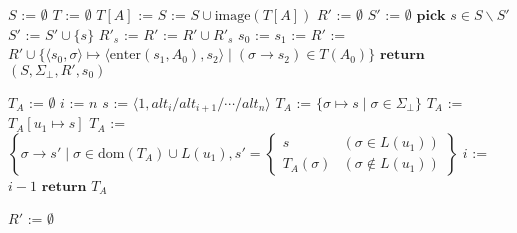 \documentclass[12pt]{article}
\begin{document}
\pagestyle{empty}

\begin{algorithmic}
        \State $S$ := $\emptyset$
        \State $T$ := $\emptyset$
            \State $T[A]$ := 
            \State $S$ := $S \cup \mathrm{image}(T[A])$
        \EndFor
        \State $R'$ := $\emptyset$
        \State $S'$ := $\emptyset$
            \State $\mathbf{pick}$ $s \in S \backslash S'$
            \State $S'$ := $S' \cup \{s\}$
                \State $R'_s$ := 
                \State $R'$ := $R' \cup R'_s$
            \EndIf
        \EndWhile
        \State $s_0$ := 
        \State $s_1$ := 
        \State $R'$ := $R' \cup \{\langle s_0, \sigma\rangle \mapsto \langle\mathrm{enter}(s_1, A_0), s_2\rangle \mid (\sigma \to s_2) \in T(A_0) \}$
        \State $\mathbf{return}$ $(S, \Sigma_\bot, R', s_0)$
    \EndProcedure

        \State $T_A$ := $\emptyset$
        \State $i$ := $n$
            \State $s$ := $\langle 1, \mathit{alt}_{i} / \mathit{alt}_{i + 1} / \cdots / \mathit{alt}_n\rangle$
                \State $T_A$ := $\{\sigma \mapsto s \mid \sigma \in \Sigma_\bot\}$
                    \State $T_A$ := $T_A[u_1 \mapsto s]$
                \Else
                    \State $T_A$ := $\left\{\sigma \to s' \mid \sigma \in \mathrm{dom}(T_A) \cup L(u_1), s' = \left\{\begin{array}{ll}
                        s &(\sigma \in L(u_1)) \\
                        T_A(\sigma) &(\sigma \not\in L(u_1))
                    \end{array}\right.\right\}$
                \EndIf
            \EndIf
            \State $i$ := $i - 1$
        \EndWhile
        \State $\mathbf{return}$ $T_A$
    \EndProcedure

            \State $R'$ := $\emptyset$


\end{algorithmic}
\end{document}
